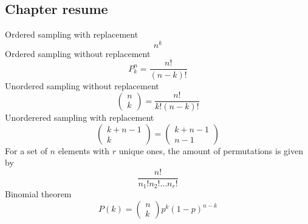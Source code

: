 \subsection{Chapter resume}
  Ordered sampling with replacement
  \[
      n^{k}
  \]
  Ordered sampling without replacement
  \[
      P_{k}^{n}=\frac{n!}{(n-k)!}
  \]
  Unordered sampling without replacement
  \[
      \begin{pmatrix}n\\k\end{pmatrix}=\frac{n!}{k!(n-k)!}
  \]
  Unorderered sampling with replacement
  \[
      \begin{pmatrix}k+n-1\\k\end{pmatrix}=\begin{pmatrix}k+n-1\\n-1\end{pmatrix}
  \]
  For a set of $n$ elements with $r$ unique ones, the amount of permutations is given by
  \[
      \frac{n!}{n_{1}!n_{2}!\ldots n_{r}!}
  \]
  Binomial theorem
  \[
      P(k)=\begin{pmatrix}n\\k\end{pmatrix}p^{k}(1-p)^{n-k}
  \]
